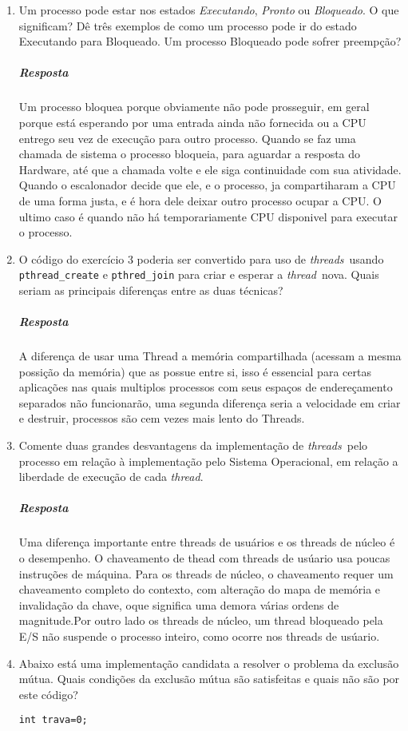 \documentclass[12pt]{article}
\newcommand{\thread}{\emph{thread}}
\newcommand{\threads}{\emph{threads}}
\begin{document}
\begin{enumerate}
 
\item
Um processo pode estar nos estados \emph{Executando}, \emph{Pronto} ou
\emph{Bloqueado}. O que significam? Dê três exemplos de como um
processo pode ir do estado Executando para Bloqueado. Um processo
Bloqueado pode sofrer preempção?

	 \subparagraph{Resposta}
 Um processo bloquea porque obviamente não pode prosseguir, em geral porque está esperando por uma entrada ainda não fornecida ou a CPU entrego seu vez de execução para outro processo.  
	 \subitem[1]
	 Quando se faz uma chamada de sistema o processo bloqueia, para aguardar a resposta do Hardware, até que a chamada volte e ele siga continuidade com sua atividade.
	 \subitem[2]
	 Quando o escalonador decide que ele, e o processo, ja compartiharam  a CPU de uma forma justa, e é hora dele deixar outro processo ocupar a CPU.
	 \subitem[3]
	 O ultimo caso é quando não há temporariamente CPU disponivel para executar o processo.
	 	 
	 
\item
O código do exercício 3 poderia ser convertido para uso de
\threads\ usando \verb+pthread_create+ e \verb+pthred_join+ para criar
e esperar a \thread\ nova. Quais seriam as principais diferenças entre
as duas técnicas?
\subparagraph{Resposta}

A diferença de usar uma Thread a memória compartilhada (acessam a mesma possição da memória) que as possue entre si, isso é essencial para certas aplicações nas quais multiplos processos com seus espaços de endereçamento separados não funcionarão, uma segunda diferença seria a velocidade em criar e destruir, processos são cem vezes mais lento do Threads.


\item
Comente duas grandes desvantagens da implementação de \threads\ pelo
processo em relação à implementação pelo Sistema Operacional, em
relação a liberdade de execução de cada \thread.
\subparagraph{Resposta}
	Uma diferença importante entre threads de usuários e os threads de núcleo é o desempenho. O chaveamento de thead com threads de usúario usa poucas instruções de máquina. Para os threads de núcleo, o chaveamento requer um chaveamento completo do contexto, com alteração do mapa de memória e invalidação da chave, oque significa uma demora várias ordens de magnitude.Por outro lado os threads de núcleo, um thread bloqueado pela E/S não suspende o processo inteiro, como ocorre nos threads de usúario.
\item
Abaixo está uma implementação candidata a resolver o problema da
exclusão mútua. Quais condições da exclusão mútua são satisfeitas e
quais não são por este código?
\begin{verbatim}
int trava=0;


\end{verbatim}
\end{enumerate}
\end{document}
